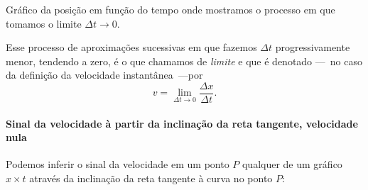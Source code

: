 \begin{marginfigure}[-2.5cm]
\caption{Gráfico da posição em função do tempo onde mostramos o processo em que tomamos o limite $\Delta t \to 0$.\label{Fig:Interp_graf_vel_med_lim}}
\end{marginfigure}

Esse processo de aproximações sucessivas em que fazemos $\Delta t$ progressivamente menor, tendendo a zero, é o que chamamos de \emph{limite} e que é denotado ---~no caso da definição da velocidade instantânea~---por
\begin{equation}
  v = \lim_{\Delta t \to 0} \frac{\Delta x}{\Delta t}.
\end{equation}

\paragraph{Sinal da velocidade à partir da inclinação da reta tangente, velocidade nula}

Podemos inferir o sinal da velocidade em um ponto $P$ qualquer de um gráfico $x\times t$ através da inclinação da reta tangente à curva no ponto $P$: 

